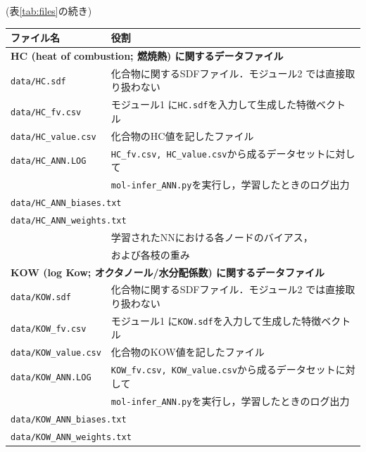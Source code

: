 \documentclass[11pt,titlepage,dvipdfmx,twoside]{jsbook}
\newcommand{\tabref}[1]{表\ref{tab:#1}}
\begin{document}
{\begin{table}[t!]
  \centering
  (\tabref{files}の続き)
  \begin{tabular}{lcll}
  \hline
  \bf ファイル名 &\ \ & \multicolumn{2}{l}{\bf 役割}\\
  \hline
  \multicolumn{4}{l}{\bf HC (heat of combustion; 燃焼熱) に関するデータファイル~\cite{pubchem}}\\
  \multicolumn{2}{l}{\tt data/HC.sdf} & \multicolumn{2}{l}{化合物に関するSDFファイル．モジュール2 では直接取り扱わない}\\
  \multicolumn{2}{l}{\tt data/HC\_fv.csv} & \multicolumn{2}{l}{モジュール1 に{\tt HC.sdf}を入力して生成した特徴ベクトル}\\
  \multicolumn{2}{l}{\tt data/HC\_value.csv} & \multicolumn{2}{l}{化合物のHC値を記したファイル}\\
  \multicolumn{2}{l}{\tt data/HC\_ANN.LOG} & \multicolumn{2}{l}{{\tt HC\_fv.csv, HC\_value.csv}から成るデータセットに対して}\\
  &&\multicolumn{2}{l}{{\tt mol-infer\_ANN.py}を実行し，学習したときのログ出力}\\
  \multicolumn{4}{l}{\tt data/HC\_ANN\_biases.txt} \\
  \multicolumn{4}{l}{\tt data/HC\_ANN\_weights.txt} \\
  &&\multicolumn{2}{l}{学習されたNNにおける各ノードのバイアス，}\\
  &&\multicolumn{2}{l}{および各枝の重み}\\
  \hline
  \multicolumn{4}{l}{\bf KOW (log Kow; オクタノール/水分配係数) に関するデータファイル~\cite{pubchem}}\\
  \multicolumn{2}{l}{\tt data/KOW.sdf} & \multicolumn{2}{l}{化合物に関するSDFファイル．モジュール2 では直接取り扱わない}\\
  \multicolumn{2}{l}{\tt data/KOW\_fv.csv} & \multicolumn{2}{l}{モジュール1 に{\tt KOW.sdf}を入力して生成した特徴ベクトル}\\
  \multicolumn{2}{l}{\tt data/KOW\_value.csv} & \multicolumn{2}{l}{化合物のKOW値を記したファイル}\\
  \multicolumn{2}{l}{\tt data/KOW\_ANN.LOG} & \multicolumn{2}{l}{{\tt KOW\_fv.csv, KOW\_value.csv}から成るデータセットに対して}\\
  &&\multicolumn{2}{l}{{\tt mol-infer\_ANN.py}を実行し，学習したときのログ出力}\\
  \multicolumn{4}{l}{\tt data/KOW\_ANN\_biases.txt} \\
  \multicolumn{4}{l}{\tt data/KOW\_ANN\_weights.txt} \\

\end{tabular}
\end{table}}
\end{document}

